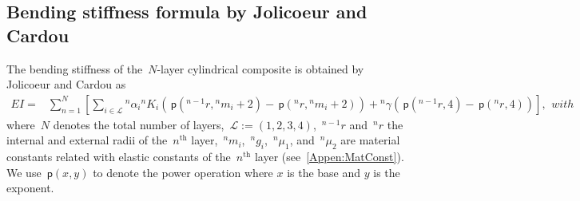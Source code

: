 \documentclass[preprint,12pt,times]{elsarticle}
\numberwithin{equation}{section}
\newcommand{\pr}[1]{\left( #1 \right)}
\newcommand{\p}{\,\mathsf{p}}
\renewcommand{\>}{$\Rightarrow$}
\begin{document}
\subsection{Bending stiffness formula by Jolicoeur and Cardou}
\label{sec:bending stiffness}
The bending stiffness of the~$N$-layer cylindrical composite is obtained by Jolicoeur and Cardou as
\begin{subequations}
\begin{equation}
	\begin{aligned}
	EI = & \sum_{n=1}^{N} \left[ \sum_{i \in \mathcal{L}} {}^{n}\!{\alpha_{i}} {}^{n}\!{K_{i}}  \pr{\p\pr{{}^{n-1}\!{r},{}^{n}\!{m_{i}}+2} - \p\pr{{}^{n}\!{r},{}^{n}\!{m_{i}} + 2}} + {}^{n}\!\gamma\pr{\p\pr{{}^{n-1}\!{r},4} - \p\pr{{}^{n}\!{r},4}} \right],
	\end{aligned}
	\label{eq:EI}
\end{equation}
with

\end{subequations}
where~$N$ denotes the total number of layers,~$\mathcal{L} := \pr{1,2,3,4}$,~${}^{n-1}\!{r}$ and~${}^{n}\!{r}$ the internal and external radii of the~$n^\text{th}$ layer,~${}^{n}\!{m_{i}}$,~${}^{n}\!{g_{i}}$,~${}^{n}\!{\mu_{1}}$, and~${}^{n}\!{\mu_{2}}$ are material constants related with elastic constants of the~$n^\text{th}$ layer (see~\ref{Appen:MatConst}). We use $\p\pr{x,y}$ to denote the power operation where $x$ is the base and $y$ is the exponent.
\end{document}
